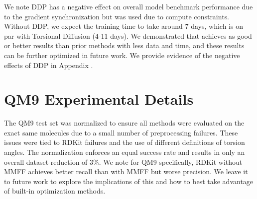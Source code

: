 We note DDP has a negative effect on overall model benchmark performance due to the gradient synchronization but was used due to compute constraints. Without DDP, we expect the training time to take around 7 days, which is on par with Torsional Diffusion (4-11 days). 
We demonstrated that \model achieves as good or better results than prior methods with less data and time, and these results can be further optimized in future work. We provide evidence of the negative effects of DDP in Appendix .

\section{QM9 Experimental Details}
\label{section:appendix-qm9}
\vspace{-1ex}
The QM9 test set was normalized to ensure all methods were evaluated on the exact same molecules due to a small number of preprocessing failures. These issues were tied to RDKit failures and the use of different definitions of torsion angles. The normalization enforces an equal success rate and results in only an overall dataset reduction of 3\%. We note for QM9 specifically, RDKit without MMFF achieves better recall than with MMFF but worse precision. We leave it to future work to explore the implications of this and how to best take advantage of built-in optimization methods.

